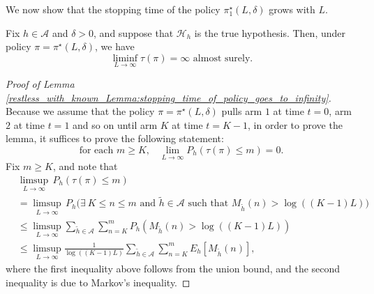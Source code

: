 We now show that the stopping time of the policy $\pi_1^\star(L,\delta)$ grows with $L$. 
\begin{lemma}\label{restless_with_known_Lemma:stopping_time_of_policy_goes_to_infinity}
	Fix $h\in\mathcal{A}$ and $\delta>0$, and suppose that $\mathcal{H}_h$ is the true hypothesis. Then, under policy $\pi=\pi^{\star}(L,\delta)$, we have
	\begin{equation}
		\liminf\limits_{L\to\infty}\tau(\pi)=\infty\text{ almost surely.}\label{restless_with_known_eq:stopping_time_of_policy_goes_to_infinity}
	\end{equation}
\end{lemma}
\begin{proof}[Proof of Lemma \ref{restless_with_known_Lemma:stopping_time_of_policy_goes_to_infinity}]
Because we assume that the policy $\pi=\pi^{\star}(L,\delta)$ pulls arm $1$ at time $t=0$, arm $2$ at time $t=1$ and so on until arm $K$ at time $t=K-1$, in order to prove the lemma, it suffices to prove the following statement:
\begin{equation}
	\text{for each $m\geq K$,}\quad \lim\limits_{L\to\infty}P_h(\tau(\pi)\leq m)=0.
\end{equation}
Fix $m\geq K$, and note that
\begingroup\allowdisplaybreaks\begin{align}
	&\limsup\limits_{L\to\infty}\,P_h(\tau(\pi)\leq m)\nonumber\\
	&=\limsup\limits_{L\to\infty}\,P_h\bigg(\exists~K\leq n\leq m \text{ and }\tilde{h}\in\mathcal{A}
	\text{ such that }M_{\tilde{h}}(n)>\log((K-1)L)\bigg)\nonumber\\
	&\leq \limsup\limits_{L\to\infty}\sum\limits_{\tilde{h}\in\mathcal{A}}\sum\limits_{n=K}^{m}P_h(M_{\tilde{h}}(n)>\log((K-1)L))\nonumber\\
	&\leq \limsup\limits_{L\to\infty}\frac{1}{\log((K-1)L)}\sum\limits_{\tilde{h}\in\mathcal{A}}\sum\limits_{n=K}^{m}E_h[M_{\tilde{h}}(n)],\label{restless_with_known_eq:stop_time_goes_to_infty_1}
\end{align}\endgroup
where the first inequality above follows from the union bound, and the second inequality is due to Markov's inequality.


\end{proof}
